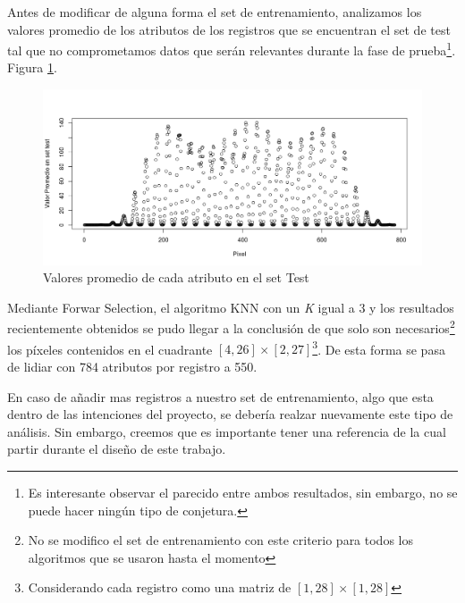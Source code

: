 Antes de modificar de alguna forma el set de entrenamiento, analizamos los valores promedio de los atributos de los registros que se encuentran el set de test tal que no comprometamos datos que serán relevantes durante la fase de prueba\footnote{Es interesante observar el parecido entre ambos resultados, sin embargo, no se puede hacer ningún tipo de conjetura.}. Figura \ref{plot2}.

\begin{figure}[htp]
  \begin{center}
    \includegraphics[width=15cm]{Rplot01.jpeg}
    \caption{Valores promedio de cada atributo en el set Test}
    \label{plot2}
  \end{center}
\end{figure}

Mediante Forwar Selection, el algoritmo KNN con un \textit{K} igual a 3 y los resultados recientemente obtenidos se pudo llegar a la conclusión de que solo son necesarios\footnote{No se modifico el set de entrenamiento con este criterio para todos los algoritmos que se usaron hasta el momento} los píxeles contenidos en el cuadrante $ [4,26]\times[2,27] $\footnote{Considerando cada registro como una matriz de $ [1,28]\times[1,28] $}. De esta forma se pasa de lidiar con 784 atributos por registro a 550.

En caso de añadir mas registros a nuestro set de entrenamiento, algo que esta dentro de las intenciones del proyecto, se debería realzar nuevamente este tipo de análisis. Sin embargo, creemos que es importante tener una referencia de la cual partir durante el diseño de este trabajo.
